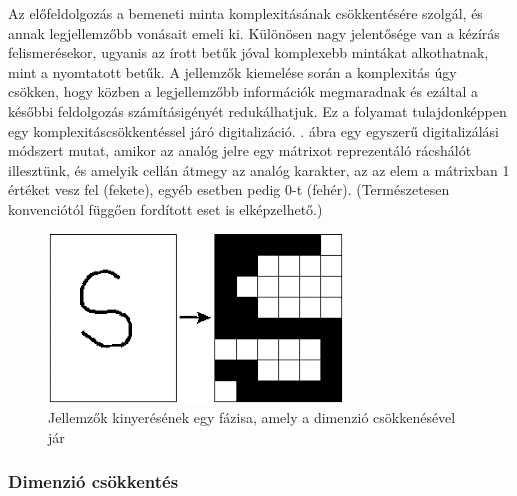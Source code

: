 Az előfeldolgozás a bemeneti minta komplexitásának csökkentésére szolgál, és annak legjellemzőbb vonásait emeli ki. Különösen nagy jelentősége van a kézírás felismerésekor, ugyanis az írott betűk jóval komplexebb mintákat alkothatnak, mint a nyomtatott betűk. A jellemzők kiemelése során a komplexitás úgy csökken, hogy közben a legjellemzőbb információk megmaradnak és ezáltal a későbbi feldolgozás számításigényét redukálhatjuk. Ez a folyamat tulajdonképpen egy komplexitáscsökkentéssel járó digitalizáció. . ábra egy egyszerű digitalizálási módszert mutat, amikor az analóg jelre egy mátrixot reprezentáló rácshálót illesztünk, és amelyik cellán átmegy az analóg karakter, az az elem a mátrixban 1 értéket vesz fel (fekete), egyéb esetben pedig 0-t (fehér). (Természetesen konvenciótól függően fordított eset is elképzelhető.)

\begin{figure}[h]
\centering
\includegraphics[scale=0.65]{images/ocr_preprocess}
\caption{Jellemzők kinyerésének egy fázisa, amely a dimenzió csökkenésével jár}
\label{fig:ocr_preprocess}
\end{figure}

\subsubsection{Dimenzió csökkentés}

